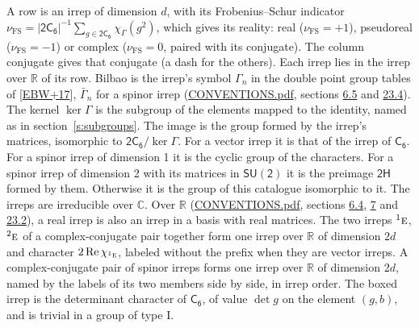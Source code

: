 \documentclass[10pt,a4paper]{article}
\numberwithin{equation}{section}
\newcommand{\grp}[1]{\mathsf{#1}}
\newcommand{\irr}[1]{\text{\normalfont\scshape #1}}
\newcommand{\conjpair}[1]{{}^{#1}}
\newcommand{\irchar}[1]{\chi_{#1}}
\newcommand{\fsind}{\nu_{\mathrm{FS}}}
\begin{document}
\leavevmode\label{n:index.frobenius}\label{n:head.irrep}\label{n:head.reality}A row is an irrep of dimension $d$, with its Frobenius--Schur indicator $\fsind = |\grp{2C_{6}}|^{-1}\allowbreak\sum_{g\in\grp{2C_{6}}}\irchar{\Gamma}(g^2)$, which gives its reality: real ($\fsind = +1$), pseudoreal ($\fsind = -1$) or complex ($\fsind = 0$, paired with its conjugate). \label{n:head.conjugate}The column conjugate gives that conjugate (a dash for the others). \label{n:head.over.real}Each irrep lies in the irrep over $\mathbb{R}$ of its row. \label{n:head.bilbao}\label{n:irrep.alias.gamma}Bilbao is the irrep's symbol $\Gamma_n$ in the double point group tables of [\href{../../../REFERENCES.pdf\#ref.EBW+17}{EBW+17}], $\bar{\Gamma}_n$ for a spinor irrep (\href{../../CONVENTIONS.pdf}{CONVENTIONS.pdf}, sections \href{../../../rotation/CONVENTIONS.pdf\#conv.6.5}{6.5} and \href{../../CONVENTIONS.pdf\#conv.23.4}{23.4}). \label{n:head.kernel}The kernel $\ker\Gamma$ is the subgroup of the elements mapped to the identity, named as in section~\ref{s:subgroups}. \label{n:head.image}The image is the group formed by the irrep's matrices, isomorphic to $\grp{2C_{6}}/\ker\Gamma$. For a vector irrep it is that of the irrep of \href{../../../rotation/data/pdf/C6.pdf}{$\grp{C_{6}}$}. For a spinor irrep of dimension 1 it is the cyclic group of the characters. For a spinor irrep of dimension 2 with its matrices in $\grp{SU(2)}$ it is the preimage $\grp{2H}$ formed by them. Otherwise it is the group of this catalogue isomorphic to it. The irreps are irreducible over $\mathbb{C}$. Over $\mathbb{R}$ (\href{../../CONVENTIONS.pdf}{CONVENTIONS.pdf}, sections \href{../../../rotation/CONVENTIONS.pdf\#conv.6.4}{6.4}, \href{../../../rotation/CONVENTIONS.pdf\#conv.7}{7} and \href{../../CONVENTIONS.pdf\#conv.23.2}{23.2}), a real irrep is also an irrep in a basis with real matrices. The two irreps $\conjpair{1}\irr{e}$, $\conjpair{2}\irr{e}$ of a complex-conjugate pair together form one irrep over $\mathbb{R}$ of dimension $2d$ and character $2\operatorname{Re}\irchar{\conjpair{1}\irr{e}}$, labeled without the prefix when they are vector irreps. A complex-conjugate pair of spinor irreps forms one irrep over $\mathbb{R}$ of dimension $2d$, named by the labels of its two members side by side, in irrep order. \label{n:mark.determinant}The boxed irrep is the determinant character of \href{../../../rotation/data/pdf/C6.pdf}{$\grp{C_{6}}$}, of value $\det g$ on the element $(g, b)$, and is trivial in a group of type I.
\setlength{\emergencystretch}{2em}\par\setlength{\emergencystretch}{0pt}
\end{document}
